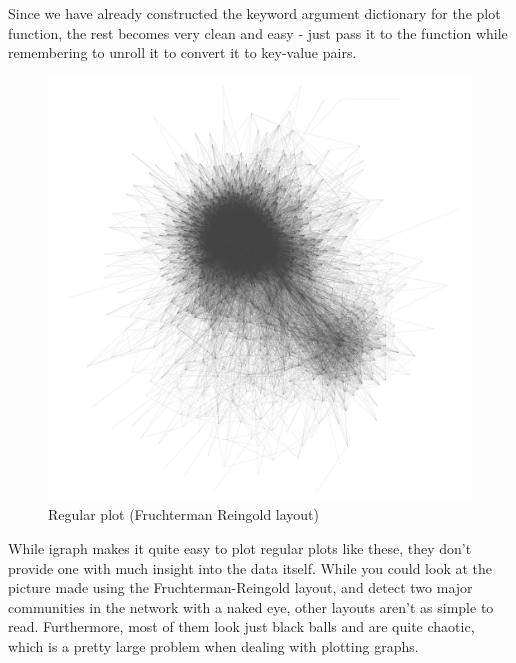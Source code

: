 \documentclass[12pt, a4paper]{article}
\begin{document}


Since we have already constructed the keyword argument dictionary for the plot function, the rest becomes very clean and easy - just pass it to the function while remembering to unroll it to convert it to key-value pairs.


\begin{figure}[hb]
    \centering
    \includegraphics[width=\textwidth]{src/youtube/hdg/hdg_simple}
    \caption{Regular plot (Fruchterman Reingold layout)}
    \label{fig:hdg_simple}
\end{figure}


While igraph makes it quite easy to plot regular plots like these, they don't provide one with much insight into the data itself. While you could look at the picture made using the Fruchterman-Reingold layout, and detect two major communities in the network with a naked eye, other layouts aren't as simple to read. Furthermore, most of them look just black balls and are quite chaotic, which is a pretty large problem when dealing with plotting graphs.
\end{document}
